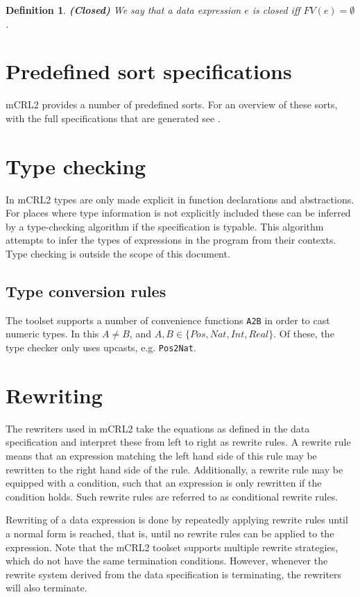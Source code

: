 \documentclass[a4paper,11pt]{article}
\newtheorem{thdefinition}{Definition}[section]
\newenvironment{definition}
  {\begin{thdefinition}\em}
  {\end{thdefinition}}
\begin{document}
\begin{definition}\textbf{(Closed)}
We say that a data expression $e$ is closed iff $FV(e) = \emptyset$.
\end{definition}

\section{Predefined sort specifications}\label{sec:predef_sorts}
mCRL2 provides a number of predefined sorts. For an overview of these sorts, with the full specifications that are generated see \cite[Appendix A]{groote07dubs}.

\section{Type checking}
In mCRL2 types are only made explicit in function declarations and abstractions. For places where type information is not explicitly included these can be inferred by a type-checking algorithm if the specification is typable. This algorithm attempts to infer the types of expressions in the program from their contexts. Type checking is outside the scope of this document.

\subsection{Type conversion rules}
The toolset supports a number of convenience functions \texttt{A2B} in order to cast numeric types. In this $A \neq B$, and $A,B \in \{Pos, Nat, Int, Real \}$. Of these, the type checker only uses upcasts, e.g. \texttt{Pos2Nat}.

\section{Rewriting}
The rewriters used in mCRL2 \cite{weerdenburg2007} take the equations as defined in the data specification and interpret these from left to right as rewrite rules. A rewrite rule means that an expression matching the left hand side of this rule may be rewritten to the right hand side of the rule. Additionally, a rewrite rule may be equipped with a condition, such that an expression is only rewritten if the condition holds. Such rewrite rules are referred to as conditional rewrite rules.

Rewriting of a data expression is done by repeatedly applying rewrite rules until a normal form is reached, that is, until no rewrite rules can be applied to the expression. Note that the mCRL2 toolset supports multiple rewrite strategies, which do not have the same termination conditions. However, whenever the rewrite system derived from the data specification is terminating, the rewriters will also terminate.
\end{document}
